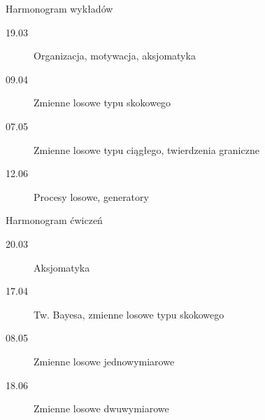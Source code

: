 \documentclass{mp}
\begin{document}
\begin{frame}{Harmonogram wykładów}
\begin{description}
\item[19.03] Organizacja, motywacja, aksjomatyka
\item[09.04] Zmienne losowe typu skokowego
\item[07.05] Zmienne losowe typu ciągłego, twierdzenia graniczne
\item[12.06] Procesy losowe, generatory
\end{description}
\end{frame}
\begin{frame}{Harmonogram ćwiczeń}
\begin{description}
\item[20.03] Aksjomatyka
\item[17.04] Tw. Bayesa, zmienne losowe typu skokowego
\item[08.05] Zmienne losowe jednowymiarowe
\item[18.06] Zmienne losowe dwuwymiarowe
\end{description}
\end{frame}
\end{document}
